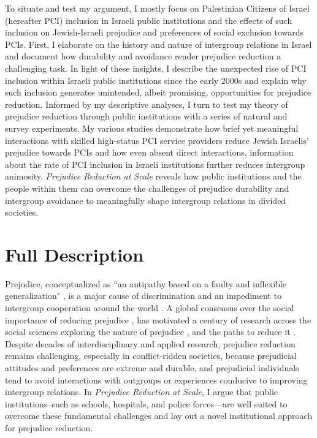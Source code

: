 \documentclass[12pt]{article}
\theoremstyle{plain}
\begin{document}
To situate and test my argument, I mostly focus on Palestinian Citizens of Israel (hereafter PCI) inclusion in Israeli public institutions and the effects of such inclusion on Jewish-Israeli prejudice and preferences of social exclusion towards PCIs. First, I elaborate on the history and nature of intergroup relations in Israel and document how durability and avoidance render prejudice reduction a challenging task. In light of these insights, I describe the unexpected rise of PCI inclusion within Israeli public institutions since the early 2000s and explain why such inclusion generates unintended, albeit promising, opportunities for prejudice reduction. Informed by my descriptive analyses, I turn to test my theory of prejudice reduction through public institutions with a series of natural and survey experiments. My various studies demonstrate how brief yet meaningful interactions with skilled high-status PCI service providers reduce Jewish Israelis' prejudice towards PCIs and how even absent direct interactions, information about the rate of PCI inclusion in Israeli institutions further reduces intergroup animosity. \emph{Prejudice Reduction at Scale} reveals how public institutions and the people within them can overcome the challenges of prejudice durability and intergroup avoidance to meaningfully shape intergroup relations in divided societies. 




\section*{Full Description}
Prejudice, conceptualized as ``an antipathy based on a faulty and inflexible generalization" \citep[p. 9]{Allport1954}, is a major cause of discrimination and an impediment to intergroup cooperation around the world \citep{Enos:2018aa,Peyton:2021aa}. A global consensus over the social importance of reducing prejudice \citep{UNIES:2006tx}, has motivated a century of research across the social sciences exploring the nature of prejudice \citep{Allport1954,Fiske:1998aa}, and the paths to reduce it \citep{Paluck:2020aa}. Despite decades of interdisciplinary and applied research, prejudice reduction remains challenging, especially in conflict-ridden societies, because prejudicial attitudes and preferences are extreme and durable, and prejudicial individuals tend to avoid interactions with outgroups or experiences conducive to improving intergroup relations. In \emph{Prejudice Reduction at Scale}, I argue that public institutions--such as schools, hospitals, and police forces---are well suited to overcome these fundamental challenges and lay out a novel institutional approach for prejudice reduction.
\end{document}
